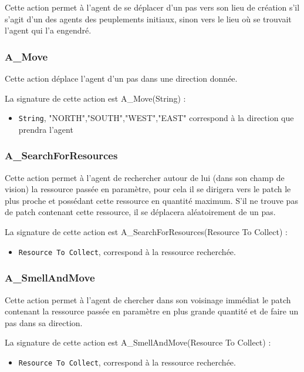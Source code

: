 	Cette action permet à l'agent de se déplacer d'un pas vers son lieu de création s'il s'agit d'un des agents des peuplements initiaux, sinon vers le lieu où se trouvait l'agent qui l'a engendré.
	
	\subsubsection{A\_Move}
	
	Cette action déplace l'agent d'un pas dans une direction donnée.
	
	 La signature de cette action est A\_Move(String) :
	
	\begin{itemize}
	\item \texttt{String}, "NORTH","SOUTH","WEST","EAST" correspond à la direction que prendra  l'agent
	\end{itemize}
	
	\subsubsection{A\_SearchForResources} 
	
	Cette action permet à l'agent de rechercher autour de lui (dans son champ de vision)  la ressource passée en paramètre,  pour cela il se dirigera vers le patch le plus proche et  possédant cette ressource en quantité maximum. S'il ne trouve pas de patch contenant cette ressource, il se déplacera aléatoirement de un pas.
	
	 La signature de cette action est A\_SearchForResources(Resource To Collect) :
	
	\begin{itemize}
	\item \texttt{Resource To Collect}, correspond à la ressource recherchée.
	\end{itemize}
	
	\subsubsection{A\_SmellAndMove}
	
	Cette action permet à l'agent de chercher dans son voisinage immédiat le patch contenant la ressource passée en paramètre en plus grande quantité et de faire un pas dans sa direction. 
	
	La signature de cette action est A\_SmellAndMove(Resource To Collect) :
	
	\begin{itemize}
	\item \texttt{Resource To Collect}, correspond à la ressource recherchée.
	\end{itemize}
	
	